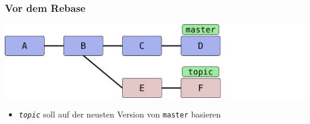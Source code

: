 \documentclass{beamer}
\begin{document}
\begin{frame}
	\frametitle{Vor dem Rebase}

	\begin{center}
		\includegraphics[scale=0.12]{bilder/rebase-vorher.pdf}
	\end{center}

	\begin{itemize}
		\item \texttt{\emph{topic}} soll auf der neusten Version von \texttt{master} basieren
	\end{itemize}

\end{frame}
\end{document}
